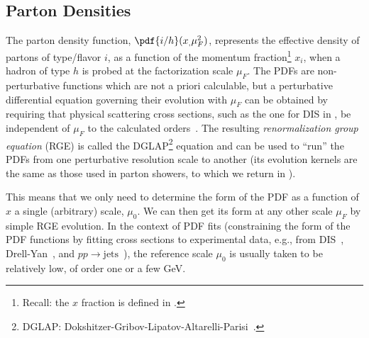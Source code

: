 \subsection{Parton Densities \label{sec:pdfs}}
%
%
%

The parton density function, $\pdf{i/h}(x_, \mu_F^2)$, represents the effective
density of partons of type/flavor $i$, as a function of the momentum
fraction\footnote{Recall: the $x$ fraction is defined in .}
$x_i$, when a hadron 
of type $h$ is probed at the factorization scale $\mu_F$. 
The PDFs are
non-perturbative functions which are not a priori calculable, but a
perturbative differential equation governing their evolution with
$\mu_F$ can be 
obtained by requiring that physical scattering cross sections, such as
the one for DIS in , be
independent of $\mu_F$ to the calculated
orders~\cite{Altarelli:1977zs}. 
%
%
The resulting \emph{renormalization group equation} (RGE) is called the
DGLAP\footnote{DGLAP: 
Dokshitzer-Gribov-Lipatov-Altarelli-Parisi~\cite{Gribov:1972ri,Altarelli:1977zs,Dokshitzer:1977sg}.} equation 
and can be used to ``run'' the PDFs from one perturbative
resolution scale to another (its evolution kernels are the same as those
used in parton showers, to which we return in
). 

This means that we only need to determine 
the form of the PDF as a function of $x$ a single (arbitrary) scale,
$\mu_0$. We can then get its form at any other scale $\mu_F$ by simple
RGE evolution.
In the context of PDF fits (constraining
the form of the PDF functions by fitting cross sections to experimental
data, e.g., from DIS~\cite{Mason:2007zz,CooperSarkar:2012tx},
Drell-Yan~\cite{Alekhin:2006zm,deOliveira:2012ji}, and
$pp\to\mbox{jets}$~\cite{Alekhin:2011sk}), 
the reference scale
$\mu_0$ is usually taken to be relatively low, of order one or a 
few GeV.

